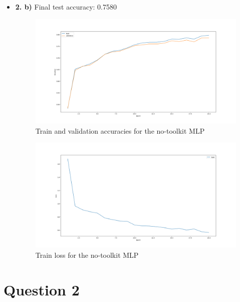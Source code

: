 \documentclass[12pt]{article}
\begin{document}
\begin{itemize}
    \item \textbf{2. b)} Final test accuracy: 0.7580
    \begin{figure}[H]
        \centering
        \includegraphics[width=1\linewidth]{../outputs/hw1-q1-2b.001-acc.png}
        \caption{Train and validation accuracies for the no-toolkit MLP}
        \label{fig:2b:acc}
    \end{figure}
    \begin{figure}[H]
        \centering
        \includegraphics[width=1\linewidth]{../outputs/hw1-q1-2b.001-loss.png}
        \caption{Train loss for the no-toolkit MLP}
        \label{fig:2b:loss}
    \end{figure}
\end{itemize}

\section*{Question 2}
\end{document}
